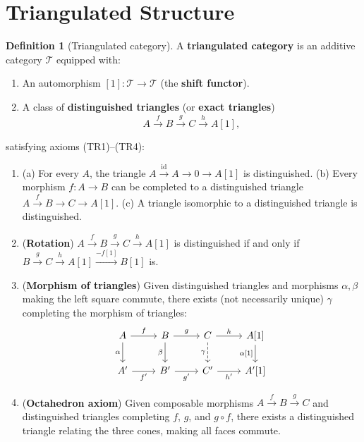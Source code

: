 \documentclass[a4paper,12pt]{book}
\newcommand{\id}{\mathrm{id}}
\theoremstyle{definition}
\newtheorem{definition}{Definition}[section]
\theoremstyle{plain}
\theoremstyle{remark}
\begin{document}
\section{Triangulated Structure}\label{sec:triangulated}

\begin{definition}[Triangulated category]\label{def:triangulated-cat}
A \textbf{triangulated category} is an additive category $\mathcal{T}$ equipped with:
\begin{enumerate}
    \item An automorphism $[1] \colon \mathcal{T} \to \mathcal{T}$ (the \textbf{shift functor}).
    \item A class of \textbf{distinguished triangles} (or \textbf{exact triangles})
    \[
        A \xrightarrow{f} B \xrightarrow{g} C \xrightarrow{h} A[1],
    \]
\end{enumerate}
satisfying axioms (TR1)--(TR4):
\begin{enumerate}
    \item[(TR1)] (a) For every $A$, the triangle $A \xrightarrow{\id} A \to 0 \to A[1]$ is
    distinguished. (b) Every morphism $f \colon A \to B$ can be completed to a distinguished
    triangle $A \xrightarrow{f} B \to C \to A[1]$. (c) A triangle isomorphic to a
    distinguished triangle is distinguished.
    \item[(TR2)] (\textbf{Rotation})
    $A \xrightarrow{f} B \xrightarrow{g} C \xrightarrow{h} A[1]$ is distinguished
    if and only if $B \xrightarrow{g} C \xrightarrow{h} A[1] \xrightarrow{-f[1]} B[1]$ is.
    \item[(TR3)] (\textbf{Morphism of triangles}) Given distinguished triangles and morphisms
    $\alpha, \beta$ making the left square commute, there exists (not necessarily unique)
    $\gamma$ completing the morphism of triangles:
    \[
    \begin{tikzcd}
        A \arrow[r, "f"] \arrow[d, "\alpha"'] & B \arrow[r, "g"] \arrow[d, "\beta"']
        & C \arrow[r, "h"] \arrow[d, dashed, "\gamma"'] & A{[1]} \arrow[d, "\alpha{[1]}"'] \\
        A' \arrow[r, "f'"'] & B' \arrow[r, "g'"'] & C' \arrow[r, "h'"'] & A'{[1]}
    \end{tikzcd}
    \]
    \item[(TR4)] (\textbf{Octahedron axiom})
    Given composable morphisms $A \xrightarrow{f} B \xrightarrow{g} C$ and distinguished
    triangles completing $f$, $g$, and $g \circ f$, there exists a distinguished triangle
    relating the three cones, making all faces commute.
\end{enumerate}
\end{definition}
\end{document}
